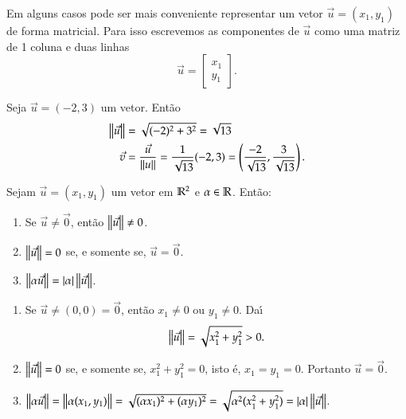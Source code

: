 Em alguns casos pode ser mais conveniente representar um vetor $\vec{u} = (x_1, y_1)$ de forma matricial. Para isso escrevemos as componentes de $\vec{u}$ como uma matriz de 1 coluna e duas linhas
\[
  \vec{u} = \begin{bmatrix}
    x_1\\y_1
  \end{bmatrix}.
\]


\begin{exemplos}
  Seja $\vec{u} = (-2,3)$ um vetor. Ent\~ao
  \begin{align*}
    \left\Vert{\vec{u}}\right\Vert &= \sqrt{(-2)^2 + 3^2} = \sqrt{13}\\
    \vec{v} &= \dfrac{\vec{u}}{\left\Vert{u}\right\Vert} = \dfrac{1}{\sqrt{13}}(-2,3) = \left(\dfrac{-2}{\sqrt{13}}, \dfrac{3}{\sqrt{13}}\right).
  \end{align*}
\end{exemplos}





\begin{proposicao}
  Sejam $\vec{u} = (x_1, y_1)$ um vetor em $\mathbb{R}^2$ e $\alpha \in \mathbb{R}$. Ent\~ao:
  \begin{enumerate}
    \item Se $\vec{u} \ne \vec{0}$, ent\~ao $\left\Vert{\vec{u}}\right\Vert \ne 0$.
    \item $\left\Vert{\vec{u}}\right\Vert = 0$ se, e somente se, $\vec{u} = \vec{0}$.
    \item $\left\Vert{\alpha\vec{u}}\right\Vert = |\alpha|\left\Vert{\vec{u}}\right\Vert$.
  \end{enumerate}
\end{proposicao}
\begin{prova}
  \begin{enumerate}
    \item  Se $\vec{u} \ne (0,0) = \vec{0}$, ent\~ao $x_1 \ne 0$ ou $y_1 \ne 0$. Da{\'\i}
    \[
      \left\Vert{\vec{u}}\right\Vert = \sqrt{x_1^2 + y_1^2} > 0.
    \]
    \item $\left\Vert{\vec{u}}\right\Vert = 0$ se, e somente se, $x_1^2 + y_1^2 = 0$, isto \'e, $x_1 = y_1 = 0$. Portanto $\vec{u} = \vec{0}$.
    \item $\left\Vert{\alpha\vec{u}}\right\Vert = \left\Vert{\alpha(x_1, y_1)}\right\Vert = \sqrt{(\alpha x_1)^2 + (\alpha y_1)^2} = \sqrt{\alpha^2(x_1^2 + y_1^2)} = |\alpha|\left\Vert{\vec{u}}\right\Vert$.
  \end{enumerate}
\end{prova}

